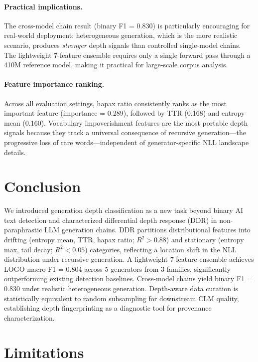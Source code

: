 \documentclass[11pt]{article}
\begin{document}
\paragraph{Practical implications.}
The cross-model chain result (binary F1 = 0.830) is particularly encouraging for real-world deployment: heterogeneous generation, which is the more realistic scenario, produces \emph{stronger} depth signals than controlled single-model chains. The lightweight 7-feature ensemble requires only a single forward pass through a 410M reference model, making it practical for large-scale corpus analysis.

\paragraph{Feature importance ranking.}
Across all evaluation settings, hapax ratio consistently ranks as the most important feature (importance = 0.289), followed by TTR (0.168) and entropy mean (0.160). Vocabulary impoverishment features are the most portable depth signals because they track a universal consequence of recursive generation---the progressive loss of rare words---independent of generator-specific NLL landscape details.

\section{Conclusion}
\label{sec:conclusion}

We introduced generation depth classification as a new task beyond binary AI text detection and characterized differential depth response (DDR) in non-paraphrastic LLM generation chains. DDR partitions distributional features into drifting (entropy mean, TTR, hapax ratio; $R^2 > 0.88$) and stationary (entropy max, tail decay; $R^2 < 0.05$) categories, reflecting a location shift in the NLL distribution under recursive generation. A lightweight 7-feature ensemble achieves LOGO macro F1 = 0.804 across 5 generators from 3 families, significantly outperforming existing detection baselines. Cross-model chains yield binary F1 = 0.830 under realistic heterogeneous generation. Depth-aware data curation is statistically equivalent to random subsampling for downstream CLM quality, establishing depth fingerprinting as a diagnostic tool for provenance characterization.

\section*{Limitations}
\end{document}
